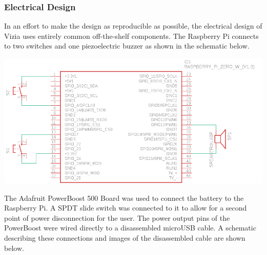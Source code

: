 \documentclass[a4paper,11pt]{article}
\begin{document}
\subsubsection{Electrical Design}
In an effort to make the design as reproducible as possible, the electrical design of Vizia uses entirely common off-the-shelf components. The Raspberry Pi connects to two switches and one piezoelectric buzzer as shown in the schematic below.

\begin{center}
    \includegraphics[scale=1.0]{img/schematics/vizia-rpi.png}
\end{center}

The Adafruit PowerBoost 500 Board was used to connect the battery to the Raspberry Pi. A SPDT slide switch was connected to it to allow for a second point of power disconnection for the user. The power output pins of the PowerBoost were wired directly to a disassembled microUSB cable. A schematic describing these connections and images of the disassembled cable are shown below.
\end{document}
